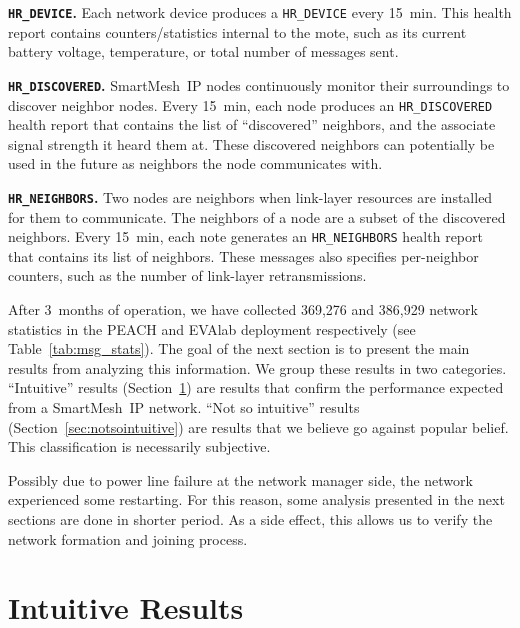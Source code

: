 \documentclass{elsarticle}
\newcommand{\smip}                {SmartMesh~IP\xspace}
\newcommand{\HRNEIGHBORS}         {{\tt HR\_NEIGHBORS}\xspace}
\newcommand{\HRDISCOVERED}        {{\tt HR\_DISCOVERED}\xspace}
\newcommand{\HRDEVICE}            {{\tt HR\_DEVICE}\xspace}
\newcommand{\PEACHNUMSTATS}       {369,276\xspace}
\newcommand{\EVANUMSTATS}         {386,929\xspace}
\begin{document}
\textbf{\HRDEVICE.}
Each network device produces a \HRDEVICE every 15~min.
This health report contains counters/statistics internal to the mote, such as its current battery voltage, temperature, or total number of messages sent.

\textbf{\HRDISCOVERED.}
\smip nodes continuously monitor their surroundings to discover neighbor nodes.
Every 15~min, each node produces an \HRDISCOVERED health report that contains the list of ``discovered'' neighbors, and the associate signal strength it heard them at.
These discovered neighbors can potentially be used in the future as neighbors the node communicates with.

\textbf{\HRNEIGHBORS.}
Two nodes are neighbors when link-layer resources are installed for them to communicate.
The neighbors of a node are a subset of the discovered neighbors.
Every 15~min, each note generates an \HRNEIGHBORS health report that contains its list of neighbors.
These messages also specifies per-neighbor counters, such as the number of link-layer retransmissions.


After 3~months of operation, we have collected \PEACHNUMSTATS and \EVANUMSTATS network statistics in the PEACH and EVAlab deployment respectively (see Table~\ref{tab:msg_stats}).
The goal of the next section is to present the main results from analyzing this information.
We group these results in two categories.
``Intuitive'' results (Section~\ref{sec:intuitive}) are results that confirm the performance expected from a \smip network.
``Not so intuitive'' results (Section~\ref{sec:notsointuitive}) are results that we believe go against popular belief.
This classification is necessarily subjective.

Possibly due to power line failure at the network manager side, the network experienced some restarting.
For this reason, some analysis presented in the next sections are done in shorter period.
As a side effect, this allows us to verify the network formation and joining process.

\section{Intuitive Results}
\label{sec:intuitive}
\end{document}
